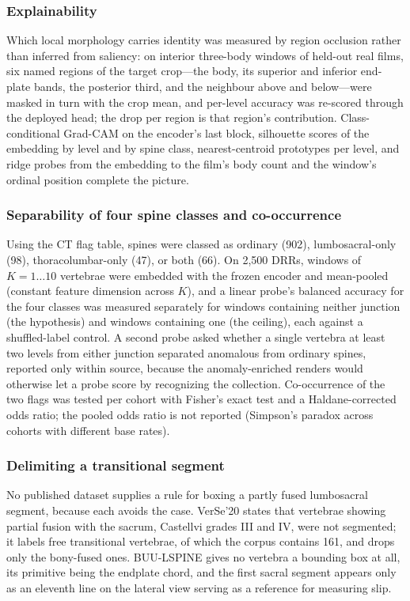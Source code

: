 \documentclass[11pt,letterpaper]{article}
\begin{document}
\subsubsection*{Explainability}
Which local morphology carries identity was measured by region occlusion rather than inferred from saliency: on interior three-body windows of held-out real films, six named regions of the target crop---the body, its superior and inferior end-plate bands, the posterior third, and the neighbour above and below---were masked in turn with the crop mean, and per-level accuracy was re-scored through the deployed head; the drop per region is that region's contribution. Class-conditional Grad-CAM on the encoder's last block, silhouette scores of the embedding by level and by spine class, nearest-centroid prototypes per level, and ridge probes from the embedding to the film's body count and the window's ordinal position complete the picture.


\subsubsection*{Separability of four spine classes and co-occurrence}
Using the CT flag table, spines were classed as ordinary (902), lumbosacral-only (98), thoracolumbar-only (47), or both (66). On 2,500 DRRs, windows of $K=1\ldots10$ vertebrae were embedded with the frozen encoder and mean-pooled (constant feature dimension across $K$), and a linear probe's balanced accuracy for the four classes was measured separately for windows containing neither junction (the hypothesis) and windows containing one (the ceiling), each against a shuffled-label control. A second probe asked whether a single vertebra at least two levels from either junction separated anomalous from ordinary spines, reported only within source, because the anomaly-enriched renders would otherwise let a probe score by recognizing the collection. Co-occurrence of the two flags was tested per cohort with Fisher's exact test and a Haldane-corrected odds ratio; the pooled odds ratio is not reported (Simpson's paradox across cohorts with different base rates).


\subsubsection*{Delimiting a transitional segment}
No published dataset supplies a rule for boxing a partly fused lumbosacral segment, because each avoids the case. VerSe'20 states that vertebrae showing partial fusion with the sacrum, Castellvi grades III and IV, were not segmented; it labels free transitional vertebrae, of which the corpus contains 161, and drops only the bony-fused ones. BUU-LSPINE gives no vertebra a bounding box at all, its primitive being the endplate chord, and the first sacral segment appears only as an eleventh line on the lateral view serving as a reference for measuring slip.
\end{document}
